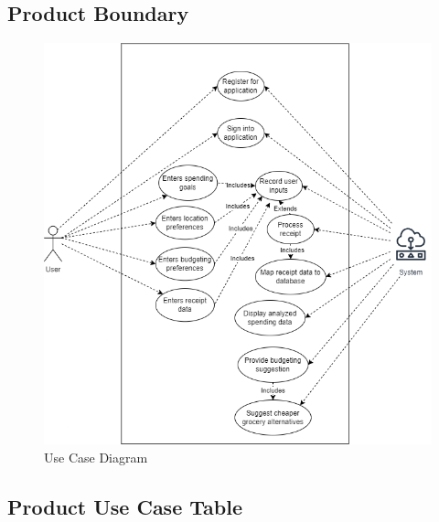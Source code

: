 \documentclass[12pt]{article}
\begin{document}
\subsection{Product Boundary}
\begin{figure}[H]
  \centering
  \includegraphics[width=\textwidth]{use_case_diagram}
  \caption{Use Case Diagram}
  \label{fig:use_case_diagram}
\end{figure}

\pagebreak
\subsection{Product Use Case Table}
\end{document}
